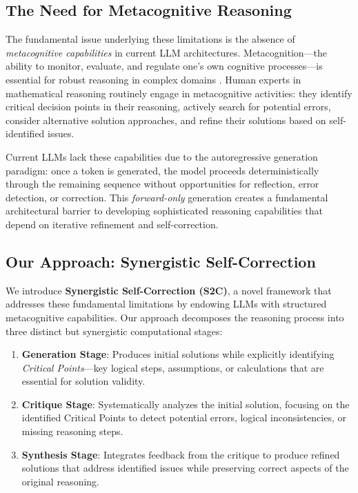 \documentclass[10pt,twocolumn]{article}
\newcommand{\ssc}{\textsc{S2C}}
\begin{document}
\subsection{The Need for Metacognitive Reasoning}

The fundamental issue underlying these limitations is the absence of \textit{metacognitive capabilities} in current LLM architectures. Metacognition—the ability to monitor, evaluate, and regulate one's own cognitive processes—is essential for robust reasoning in complex domains \cite{flavell1979metacognition, schraw1995metacognitive}. Human experts in mathematical reasoning routinely engage in metacognitive activities: they identify critical decision points in their reasoning, actively search for potential errors, consider alternative solution approaches, and refine their solutions based on self-identified issues.

Current LLMs lack these capabilities due to the autoregressive generation paradigm: once a token is generated, the model proceeds deterministically through the remaining sequence without opportunities for reflection, error detection, or correction. This \textit{forward-only} generation creates a fundamental architectural barrier to developing sophisticated reasoning capabilities that depend on iterative refinement and self-correction.

\subsection{Our Approach: Synergistic Self-Correction}

We introduce \textbf{Synergistic Self-Correction (\ssc{})}, a novel framework that addresses these fundamental limitations by endowing LLMs with structured metacognitive capabilities. Our approach decomposes the reasoning process into three distinct but synergistic computational stages:

\begin{enumerate}[leftmargin=*]
\item \textbf{Generation Stage}: Produces initial solutions while explicitly identifying \textit{Critical Points}—key logical steps, assumptions, or calculations that are essential for solution validity.

\item \textbf{Critique Stage}: Systematically analyzes the initial solution, focusing on the identified Critical Points to detect potential errors, logical inconsistencies, or missing reasoning steps.

\item \textbf{Synthesis Stage}: Integrates feedback from the critique to produce refined solutions that address identified issues while preserving correct aspects of the original reasoning.
\end{enumerate}
\end{document}
